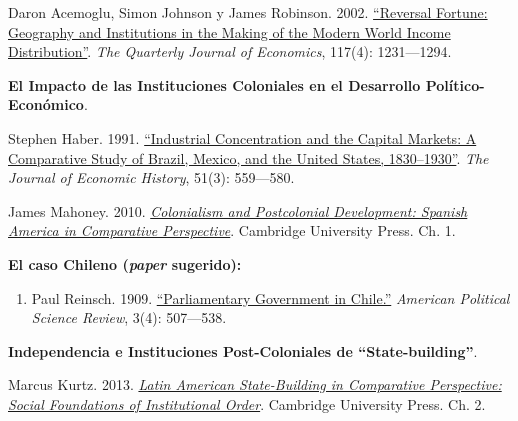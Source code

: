 \documentclass[letterpaper]{article}
\renewenvironment{itemize}{
  \begin{list}{}{
    \setlength{\leftmargin}{1.5em}
  }
}{
  \end{list}
}
\begin{document}
\begin{enumerate}[label=\roman*.]
\begin{itemize}
\begin{itemize}
          \item[$\circ$] Daron Acemoglu, Simon Johnson y James Robinson. 2002. \href{https://github.com/hbahamonde/Ciencia_Politica_II/raw/master/Readings/Reversal_of_fortune.pdf}{``Reversal Fortune: Geography and Institutions in the Making of the Modern World Income Distribution''}. \emph{The Quarterly Journal of Economics}, 117(4): 1231---1294. 
				\end{itemize}


		\item[6.] {\bf El Impacto de las Instituciones Coloniales en el Desarrollo Pol\'itico-Econ\'omico}.
				\begin{itemize}
					\item[$\circ$] Stephen Haber. 1991. \href{https://github.com/hbahamonde/Ciencia_Politica_II/raw/master/Readings/Haber.pdf}{``Industrial Concentration and the Capital Markets: A Comparative Study of Brazil, Mexico, and the United States, 1830–1930''}. \emph{The Journal of Economic History}, 51(3): 559---580. 
					
          \item[$\circ$]  James Mahoney. 2010. \href{https://github.com/hbahamonde/Ciencia_Politica_II/raw/master/Readings/Mahoney_Colonialism_PostColonialsm.pdf}{\emph{Colonialism and Postcolonial Development: Spanish America in Comparative Perspective}}. Cambridge University Press. Ch. 1. 

					\item[{\Pointinghand}] {\bf El caso Chileno (\emph{paper} sugerido):}
									\begin{enumerate}
										\item Paul Reinsch. 1909. \href{https://github.com/hbahamonde/Ciencia_Politica_I/raw/master/Readings/Reinsch_1909.pdf}{``Parliamentary Government in Chile.''} \emph{American Political Science Review}, 3(4): 507---538.
									\end{enumerate}

				\end{itemize}

		\item[7.] {\bf Independencia e Instituciones Post-Coloniales de ``State-building''}.
				\begin{itemize}
					\item[$\circ$]  Marcus Kurtz. 2013. \href{https://github.com/hbahamonde/Ciencia_Politica_II/raw/master/Readings/Kurtz_2013.pdf}{\emph{Latin American State-Building in Comparative Perspective: Social Foundations of Institutional Order}}. Cambridge University Press. Ch. 2.
					

\end{itemize}
\end{itemize}
\end{enumerate}
\end{document}
